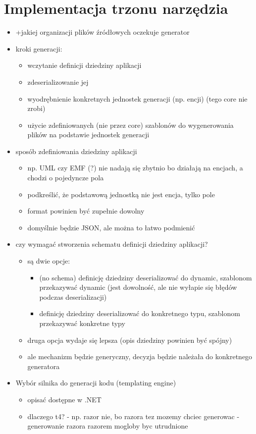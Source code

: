 \chapter{Implementacja trzonu narzędzia} \label{chap:implementation:core}

\begin{itemize}
 \item +jakiej organizacji plików źródłowych oczekuje generator
 \item kroki generacji:
  \begin{itemize}
   \item wczytanie definicji dziedziny aplikacji
   \item zdeserializowanie jej
   \item wyodrębnienie konkretnych jednostek generacji (np. encji) (tego core nie zrobi)
   \item użycie zdefiniowanych (nie przez core) szablonów do wygenerowania plików na podstawie jednostek generacji
  \end{itemize}
 \item sposób zdefiniowania dziedziny aplikacji
  \begin{itemize}
   \item np. UML czy EMF (?) nie nadają się zbytnio bo działają na encjach, a chodzi o pojedyncze pola
   \item podkreślić, że podstawową jednostką nie jest encja, tylko pole
   \item format powinien być zupełnie dowolny
   \item domyślnie będzie JSON, ale można to łatwo podmienić
  \end{itemize}
 \item czy wymagać stworzenia schematu definicji dziedziny aplikacji?
  \begin{itemize}
   \item są dwie opcje:
    \begin{itemize}
     \item (no schema) definicję dziedziny deserializować do dynamic, szablonom przekazywać dynamic (jest dowolność, ale nie wyłapie się błędów podczas deserializacji)
     \item definicję dziedziny deserializować do konkretnego typu, szablonom przekazywać konkretne typy
    \end{itemize}
   \item druga opcja wydaje się lepsza (opis dziedziny powinien być spójny)
   \item ale mechanizm będzie generyczny, decyzja będzie należała do konkretnego generatora
  \end{itemize}
 \item Wybór silnika do generacji kodu (templating engine)
  \begin{itemize}
   \item opisać dostępne w .NET
   \item dlaczego t4? - np. razor nie, bo razora tez mozemy chciec generowac - generowanie razora razorem mogloby byc utrudnione
  \end{itemize}
\end{itemize}

